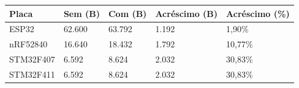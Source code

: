\begin{tabular}{lllll}
\hline
Placa & Sem (B) & Com (B) & Acréscimo (B) & Acréscimo (\%) \\
\hline
ESP32 & 62.600 & 63.792 & 1.192 & 1,90\% \\
nRF52840 & 16.640 & 18.432 & 1.792 & 10,77\% \\
STM32F407 & 6.592 & 8.624 & 2.032 & 30,83\% \\
STM32F411 & 6.592 & 8.624 & 2.032 & 30,83\% \\
\hline
\end{tabular}
